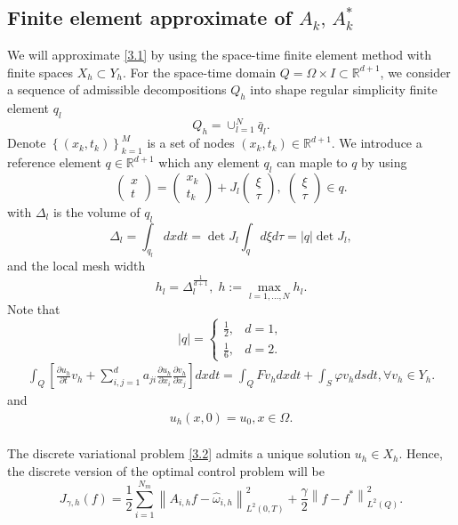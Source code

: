 \documentclass[]{article}
\begin{document}
\subsection{Finite element approximate of $A_k,\, A_k^*$}
We will approximate \eqref{3.1} by using the space-time finite element method with finite spaces $X_h \subset Y_h$. For the space-time domain $Q=\Omega\times I\subset \mathbb{R}^{d+1}$, we consider a sequence of admissible decompositions $Q_h$ into shape regular simplicity finite element $q_l$
$$Q_h=\cup_{l=1}^{N}\bar{q}_l.$$
Denote $\left\lbrace (x_k, t_k)\right\rbrace_{k=1}^M $ is a set of nodes $(x_k, t_k)\in \mathbb{R}^{d+1}$. We introduce a reference element $q\in \mathbb{R}^{d+1}$ which any element $q_l$ can maple to $q$ by using
$$\begin{pmatrix}x\\t\end{pmatrix}=\begin{pmatrix}x_k\\t_k\end{pmatrix}+J_l\begin{pmatrix}\xi\\\tau\end{pmatrix}, \; \begin{pmatrix}\xi\\\tau\end{pmatrix}\in q.$$
with $\Delta_l$ is the volume of $q_l$ 
$$\Delta_l=\int_{q_l}dxdt=\det J_l\int_q d\xi d\tau=|q|\det J_l,$$
and the local mesh width
$$h_l=\Delta_l^{\frac{1}{d+1}},\; h:=\max_{l=1, ..., N}h_l.$$
Note that
$$|q|=\begin{cases}
	\frac{1}{2},& d=1,\\[0.1cm]
	\frac{1}{6},& d=2.
\end{cases}$$
\begin{align}\label{3.2}
	\int_{Q}\left[\frac{\partial u_h}{\partial t}v_h+\sum_{i, j=1}^{d}a_{ji}\frac{\partial u_h}{\partial x_i}\frac{\partial v_h}{\partial x_j}\right]dxdt=\int_{Q}Fv_hdxdt+\int_{S}\varphi v_hdsdt, \forall v_h\in Y_h.
\end{align}
and 
\begin{align}\label{3.3}
	u_h(x, 0)=u_0, x\in \Omega.
\end{align}
\\
The discrete variational problem \eqref{3.2} admits a unique solution $u_h\in X_h$. Hence, the discrete version of the optimal control problem will be
$$J_{\gamma, h}(f)=\frac{1}{2}\sum_{i=1}^{N_m}\left\|A_{i, h}f-\hat{\omega}_{i, h}\right\|^2_{L^2(0, T)}+\frac{\gamma}{2}\left\|f-f^*\right\|^2_{L^2(Q)}.$$
\end{document}
